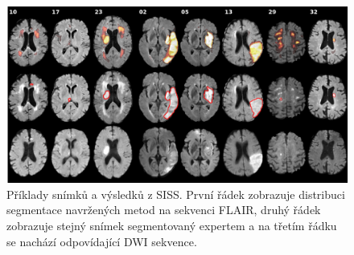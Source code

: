 \documentclass[11pt]{article}
\begin{document}
\begin{figure}[]
	\label{img-isles2015}
	\centering
	\includegraphics[width=\textwidth]{isles2015}
	\caption{Příklady snímků a výsledků z SISS. První řádek zobrazuje distribuci segmentace navržených metod na sekvenci FLAIR, druhý řádek zobrazuje stejný snímek segmentovaný expertem a na třetím řádku se nachází odpovídající DWI sekvence.}
\end{figure}
\end{document}
